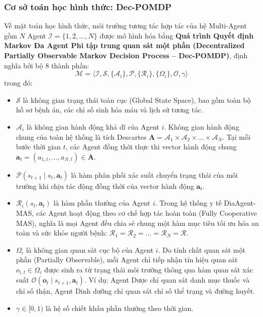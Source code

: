 \documentclass[12pt,a4paper]{article}
\begin{document}
\subsubsection{Cơ sở toán học hình thức: Dec-POMDP}
Về mặt toán học hình thức, môi trường tương tác hợp tác của hệ Multi-Agent gồm $N$ Agent $\mathcal{I} = \{1, 2, \dots, N\}$ được mô hình hóa bằng \textbf{Quá trình Quyết định Markov Đa Agent Phi tập trung quan sát một phần (Decentralized Partially Observable Markov Decision Process -- Dec-POMDP)}, định nghĩa bởi bộ 8 thành phần:
\begin{equation}
    \mathcal{M} = \langle \mathcal{I}, \mathcal{S}, \{\mathcal{A}_i\}, \mathcal{P}, \{\mathcal{R}_i\}, \{\Omega_i\}, \mathcal{O}, \gamma \rangle
\end{equation}
trong đó:
\begin{itemize}[leftmargin=1.2cm]
    \item $\mathcal{S}$ là không gian trạng thái toàn cục (Global State Space), bao gồm toàn bộ hồ sơ bệnh án, các chỉ số sinh hóa máu và lịch sử tương tác.
    \item $\mathcal{A}_i$ là không gian hành động khả dĩ của Agent $i$. Không gian hành động chung của toàn hệ thống là tích Descartes $\mathbf{A} = \mathcal{A}_1 \times \mathcal{A}_2 \times \dots \times \mathcal{A}_N$. Tại mỗi bước thời gian $t$, các Agent đồng thời thực thi vector hành động chung $\mathbf{a}_t = (a_{1,t}, \dots, a_{N,t}) \in \mathbf{A}$.
    \item $\mathcal{P}(s_{t+1} \mid s_t, \mathbf{a}_t)$ là hàm phân phối xác suất chuyển trạng thái của môi trường khi chịu tác động đồng thời của vector hành động $\mathbf{a}_t$.
    \item $\mathcal{R}_i(s_t, \mathbf{a}_t)$ là hàm phần thưởng của Agent $i$. Trong hệ thống y tế DiaAgent-MAS, các Agent hoạt động theo cơ chế hợp tác hoàn toàn (Fully Cooperative MAS), nghĩa là mọi Agent đều chia sẻ chung một hàm mục tiêu tối ưu hóa an toàn và sức khỏe người bệnh: $\mathcal{R}_1 = \mathcal{R}_2 = \dots = \mathcal{R}_N = \mathcal{R}$.
    \item $\Omega_i$ là không gian quan sát cục bộ của Agent $i$. Do tính chất quan sát một phần (Partially Observable), mỗi Agent chỉ tiếp nhận tín hiệu quan sát $o_{i,t} \in \Omega_i$ được sinh ra từ trạng thái môi trường thông qua hàm quan sát xác suất $\mathcal{O}(\mathbf{o}_t \mid s_{t+1}, \mathbf{a}_t)$. Ví dụ: Agent Dược chỉ quan sát danh mục thuốc và chỉ số thận, Agent Dinh dưỡng chỉ quan sát chỉ số thể trạng và đường huyết.
    \item $\gamma \in [0, 1)$ là hệ số chiết khấu phần thưởng theo thời gian.
\end{itemize}
\end{document}
